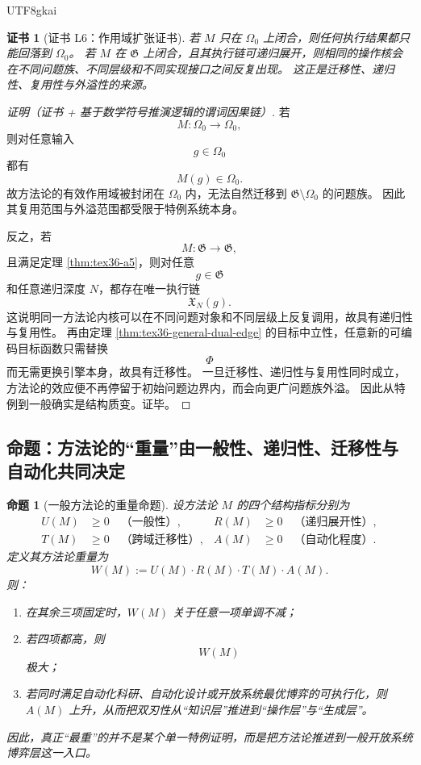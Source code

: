 \documentclass[12pt]{article}
\newtheorem{proposition}{命题}[section]
\newtheorem{Certificate}{证书}[section]
\begin{document}
\begin{CJK*}{UTF8}{gkai}
\begin{Certificate}[证书 L6：作用域扩张证书]
\label{cert:tex36-l6}
若 $M$ 只在 $\Omega_0$ 上闭合，则任何执行结果都只能回落到 $\Omega_0$。
若 $M$ 在 $\mathfrak G$ 上闭合，且其执行链可递归展开，则相同的操作核会在不同问题族、不同层级和不同实现接口之间反复出现。
这正是迁移性、递归性、复用性与外溢性的来源。
\end{Certificate}

\begin{proof}[证明（证书 + 基于数学符号推演逻辑的谓词因果链）]
若
\[
  M:\Omega_0\to \Omega_0,
\]
则对任意输入
\[
  g\in \Omega_0
\]
都有
\[
  M(g)\in \Omega_0.
\]
故方法论的有效作用域被封闭在 $\Omega_0$ 内，无法自然迁移到 $\mathfrak G\setminus\Omega_0$ 的问题族。
因此其复用范围与外溢范围都受限于特例系统本身。

反之，若
\[
  M:\mathfrak G\to \mathfrak G,
\]
且满足定理 \ref{thm:tex36-a5}，则对任意
\[
  g\in \mathfrak G
\]
和任意递归深度 $N$，都存在唯一执行链
\[
  \mathfrak X_N(g).
\]
这说明同一方法论内核可以在不同问题对象和不同层级上反复调用，故具有递归性与复用性。
再由定理 \ref{thm:tex36-general-dual-edge} 的目标中立性，任意新的可编码目标函数只需替换
\[
  \Phi
\]
而无需更换引擎本身，故具有迁移性。
一旦迁移性、递归性与复用性同时成立，方法论的效应便不再停留于初始问题边界内，而会向更广问题族外溢。
因此从特例到一般确实是结构质变。证毕。
\end{proof}

\subsection{命题：方法论的“重量”由一般性、递归性、迁移性与自动化共同决定}
\label{subsec:tex36-method-weight}

\begin{proposition}[一般方法论的重量命题]
\label{prop:tex36-method-weight}
设方法论 $M$ 的四个结构指标分别为
\[
  \begin{aligned}
    U(M)&\ge 0 \quad\text{（一般性）},&
    R(M)&\ge 0 \quad\text{（递归展开性）},\\
    T(M)&\ge 0 \quad\text{（跨域迁移性）},&
    A(M)&\ge 0 \quad\text{（自动化程度）}.
  \end{aligned}
\]
定义其方法论重量为
\[
  W(M)
  :=
  U(M)\cdot R(M)\cdot T(M)\cdot A(M).
\]
则：
\begin{enumerate}
  \item 在其余三项固定时，$W(M)$ 关于任意一项单调不减；
  \item 若四项都高，则
  \[
    W(M)
  \]
  极大；
  \item 若同时满足自动化科研、自动化设计或开放系统最优博弈的可执行化，则 $A(M)$ 上升，从而把双刃性从“知识层”推进到“操作层”与“生成层”。
\end{enumerate}
因此，真正“最重”的并不是某个单一特例证明，而是把方法论推进到一般开放系统博弈层这一入口。
\end{proposition}


\end{CJK*}
\end{document}
